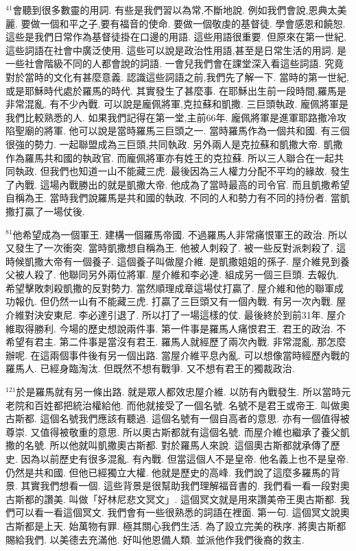 \documentclass{book}
\begin{document}
$^{41}$會聽到很多數靈的用詞.
有些是我們習以為常,不斷地說.
例如我們會說,恩典太美麗.
要做一個和平之子,要有福音的使命.
要做一個敬虔的基督徒.
學會感恩和饒恕.
這些是我們日常作為基督徒掛在口邊的用語.
這些用語很重要.
但原來在第一世紀,這些詞語在社會中廣泛使用.
這些可以說是政治性用語,甚至是日常生活的用詞.
是一些社會階級不同的人都會說的詞語.
一會兒我們會在課堂深入看這些詞語.
究竟對於當時的文化有甚麼意義.
認識這些詞語之前,我們先了解一下.
當時的第一世紀,或是耶穌時代處於羅馬的時代.
其實發生了甚麼事.
在耶穌出生前一段時間,羅馬是非常混亂.
有不少內戰.
可以說是龐佩將軍,克拉蘇和凱撒.
三巨頭執政.
龐佩將軍是我們比較熟悉的人.
如果我們記得在第一堂,主前66年.
龐佩將軍是進軍耶路撒冷攻陷聖廟的將軍.
他可以說是當時羅馬三巨頭之一.
當時羅馬作為一個共和國.
有三個很強的勢力.
一起聯盟成為三巨頭,共同執政.
另外兩人是克拉蘇和凱撒大帝.
凱撒作為羅馬共和國的執政官.
而龐佩將軍亦有姓王的克拉蘇.
所以三人聯合在一起共同執政.
但我們也知道一山不能藏三虎.
最後因為三人權力分配不平均的緣故.
發生了內戰.
這場內戰勝出的就是凱撒大帝.
他成為了當時最高的司令官.
而且凱撒希望自稱為王.
當時我們說羅馬是共和國的執政.
不同的人和勢力有不同的持份者.
當凱撒打贏了一場仗後.

$^{81}$他希望成為一個軍王.
建構一個羅馬帝國.
不過羅馬人非常痛恨軍王的政治.
所以又發生了一次衝突.
當時凱撒想自稱為王.
他被人刺殺了.
被一些反對派刺殺了.
這時候凱撒大帝有一個養子.
這個養子叫做屋介維.
是凱撒姐姐的孫子.
屋介維見到養父被人殺了.
他聯同另外兩位將軍.
屋介維和李必達.
組成另一個三巨頭.
去報仇.
希望擊敗刺殺凱撒的反對勢力.
當然順理成章這場仗打贏了.
屋介維和他的聯軍成功報仇.
但仍然一山有不能藏三虎.
打贏了三巨頭又有一個內戰.
有另一次內戰.
屋介維對決安東尼.
李必達引退了.
所以打了一場這樣的仗.
最後終於到前31年.
屋介維取得勝利.
今場的歷史想說兩件事.
第一件事是羅馬人痛恨君王.
君王的政治.
不希望有君主.
第二件事是當沒有君王.
羅馬人就經歷了兩次內戰.
非常混亂.
那怎麼辦呢.
在這兩個事件後有另一個出路.
當屋介維平息內亂.
可以想像當時經歷內戰的羅馬人.
已經身臨淘汰.
但既然不想有戰爭.
又不想有君王的獨裁政治.

$^{121}$於是羅馬就有另一條出路.
就是眾人都效忠屋介維.
以防有內戰發生.
所以當時元老院和百姓都把統治權給他.
而他就接受了一個名號.
名號不是君王或帝王.
叫做奧古斯都.
這個名號我們應該有聽過.
這個名號有一個自高者的意思.
亦有一個值得被尊崇.
又值得被敬重的意思.
所以奧古斯都就有這個名號.
而屋介維也繼承了養父凱撒的名號.
所以他就叫凱撒奧古斯都.
對於羅馬人來說.
這個奧古斯都就承傳了歷史.
因為以前歷史有很多混亂.
有內戰.
但當這個人不是皇帝.
他名義上也不是皇帝.
仍然是共和國.
但他已經獨立大權.
他就是歷史的高峰.
我們說了這麼多羅馬的背景.
其實我們想看一個.
這些背景是很幫助我們理解福音書的.
我們看一看一段對奧古斯都的讚美.
叫做「好林尼悲文冥文」.
這個冥文就是用來讚美帝王奧古斯都.
我們可以看一看這個冥文.
我們會有一些很熟悉的詞語在裡面.
第一句.
這個冥文說奧古斯都是上天.
始萬物有罪.
極其關心我們生活.
為了設立完美的秩序.
將奧古斯都賜給我們.
以美德去充滿他.
好叫他恩備人類.
並派他作我們後裔的救主.
\end{document}
